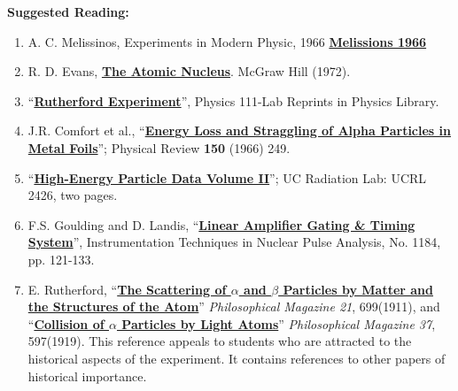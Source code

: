 \documentclass{../lab}
\begin{document}
\noindent\textbf{Suggested Reading:}

\begin{enumerate}
    \item A. C. Melissinos, Experiments in Modern Physic, 1966 \href{http://physics111.lib.berkeley.edu/Physics111/Reprints/RUT/RUT\%20\%20melissinos\%201966\%20rutherford\%20scattering.pdf}{\textbf{Melissions 1966}}

    \item R. D. Evans, \href{http://physics111.lib.berkeley.edu/Physics111/Reprints/R.D.Evans\%20Atomic\%20Nucleus/The\%20Atomic\%20Nucleus\%20Evans\%20full\%20text.pdf}{\textbf{The Atomic Nucleus}}. McGraw Hill (1972).

    \item ``\href{http://physics111.lib.berkeley.edu/Physics111/Reprints/RUT/03-Physics\_111\_Rutherford\_Scattering\_Experiment.pdf}{\textbf{Rutherford Experiment}}'', Physics 111-Lab Reprints in Physics Library.

    \item J.R. Comfort et al., ``\href{http://physics111.lib.berkeley.edu/Physics111/Reprints/RUT/01-Energy\_Loss\_and\_Straggling.pdf}{\textbf{Energy Loss and Straggling of Alpha Particles in Metal Foils}}''; Physical Review \textbf{150} (1966) 249. 

    \item ``\href{http://physics111.lib.berkeley.edu/Physics111/Reprints/RUT/02-High\_Energy\_Particle\_Data.pdf}{\textbf{High-Energy Particle Data Volume II}}''; UC Radiation Lab: UCRL 2426, two pages.

    \item F.S. Goulding and D. Landis, ``\href{http://physics111.lib.berkeley.edu/Physics111/Reprints/RUT/04-Linear\_Amplifier.pdf}{\textbf{Linear Amplifier Gating \& Timing System}}'', Instrumentation Techniques in Nuclear Pulse Analysis, No. 1184, pp. 121-133.

    \item E. Rutherford, ``\href{http://physics111.lib.berkeley.edu/Physics111/Reprints/RUT/The_Scattering_of_Alpha_and_Beta_Particles_By_Matter_and_the_Structures_of_the_Atom.pdf}{\textbf{The Scattering of $ \alpha $ and $ \beta $ Particles by Matter and the Structures of the Atom}}'' \emph{Philosophical Magazine 21}, 699(1911), and ``\href{http://physics111.lib.berkeley.edu/Physics111/Reprints/RUT/Collision_of_Particles_by_Light_Atoms.pdf}{\textbf{Collision of $ \alpha $ Particles by Light Atoms}}'' \emph{Philosophical Magazine 37}, 597(1919). This reference appeals to students who are attracted to the historical aspects of the experiment. It contains references to other papers of historical importance.

\end{enumerate}
\end{document}
